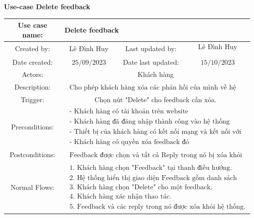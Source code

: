 \pagebreak
\textbf{Use-case Delete feedback}\par
\vspace{0.5cm}
\begin{tabular}{|c|c|c|c|}
\hline Use case name: & \multicolumn{3}{|l|}{ Delete feedback} \\
\hline Created by: & Lê Đình Huy & Last updated by: & $\begin{array}{l}\text { Lê Đình Huy } \\\end{array}$ \\
\hline Date created: & $25 / 09 / 2023$ & Date last updated: & $15 / 10 / 2023$\\
\hline Actors: & \multicolumn{3}{|c|}{ Khách hàng } \\
\hline Description: & \multicolumn{3}{|c|}{$\begin{array}{l}\text { Cho phép khách hàng xóa các phản hồi của mình về hệ thống. } \end{array}$} \\
\hline Trigger: & \multicolumn{3}{|c|}{ Chọn nút "Delete" cho feedback cần xóa. } \\
\hline Preconditions: & \multicolumn{3}{|c|}{$\begin{array}{l}\text { - Khách hàng có tài khoản trên website } \\
\text { - Khách hàng đã đăng nhập thành công vào hệ thống } \\
\text { - Thiết bị của khách hàng có kết nối mạng và kết nối với hệ thống }\\
\text { - Khách hàng có quyền xóa feedback đó }\end{array}$} \\
\hline Postconditions: & \multicolumn{3}{|c|}{$\begin{array}{l}\text { Feedback được chọn và tất cả Reply trong nó bị xóa khỏi hệ thống. } \end{array}$} \\
\hline Normal Flows: & \multicolumn{3}{|c|}{$\begin{array}{l}\text { 1. Khách hàng chọn "Feedback" tại thanh điều hướng.} \\
\text { 2. Hệ thống hiển thị giao diện Feedback gồm danh sách các feedback.} \\
\text{  3. Khách hàng chọn "Delete" cho một feedback.}\\
\text { 4. Khách hàng xác nhận thao tác.  }\\
\text { 5. Feedback và các reply trong nó được xóa khỏi hệ thống.}\end{array}$} \\

\end{tabular}
